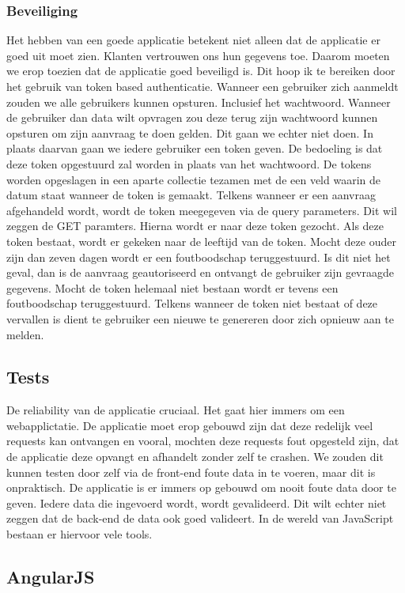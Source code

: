 \documentclass[a4paper,11pt]{article}
\begin{document}
\subsubsection{Beveiliging}
Het hebben van een goede applicatie betekent niet alleen dat de applicatie er goed uit moet zien. Klanten vertrouwen ons hun gegevens toe. Daarom moeten we erop toezien dat de applicatie goed beveiligd is. Dit hoop ik te bereiken door het gebruik van token based authenticatie. Wanneer een gebruiker zich aanmeldt zouden we alle gebruikers kunnen opsturen. Inclusief het wachtwoord. Wanneer de gebruiker dan data wilt opvragen zou deze terug zijn wachtwoord kunnen opsturen om zijn aanvraag te doen gelden. Dit gaan we echter niet doen. In plaats daarvan gaan we iedere gebruiker een token geven. De bedoeling is dat deze token opgestuurd zal worden in plaats van het wachtwoord. De tokens worden opgeslagen in een aparte collectie tezamen met de een veld waarin de datum staat wanneer de token is gemaakt. Telkens wanneer er een aanvraag afgehandeld wordt, wordt de token meegegeven via de query parameters. Dit wil zeggen de GET paramters. Hierna wordt er naar deze token gezocht. Als deze token bestaat, wordt er gekeken naar de leeftijd van de token. Mocht deze ouder zijn dan zeven dagen wordt er een foutboodschap teruggestuurd. Is dit niet het geval, dan is de aanvraag geautoriseerd en ontvangt de gebruiker zijn gevraagde gegevens. Mocht de token helemaal niet bestaan wordt er tevens een foutboodschap teruggestuurd. Telkens wanneer de token niet bestaat of deze vervallen is dient te gebruiker een nieuwe te genereren door zich opnieuw aan te melden.

\subsection{Tests}
De reliability van de applicatie cruciaal. Het gaat hier immers om een webapplictatie. De applicatie moet erop gebouwd zijn dat deze redelijk veel requests kan ontvangen en vooral, mochten deze requests fout opgesteld zijn, dat de applicatie deze opvangt en afhandelt zonder zelf te crashen. We zouden dit kunnen testen door zelf via de front-end foute data in te voeren, maar dit is onpraktisch. De applicatie is er immers op gebouwd om nooit foute data door te geven. Iedere data die ingevoerd wordt, wordt gevalideerd. Dit wilt echter niet zeggen dat de back-end de data ook goed valideert. In de wereld van JavaScript bestaan er hiervoor vele tools.

\subsection{AngularJS}
\end{document}
